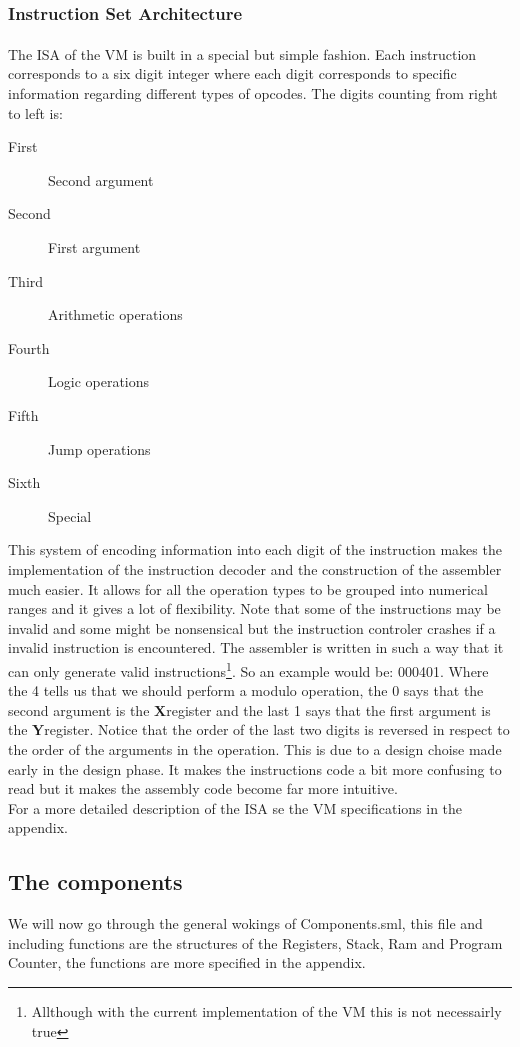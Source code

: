 \documentclass{article}
\newcommand{\x}{$\textbf{X}$}
\newcommand{\y}{$\textbf{Y}$}
\begin{document}
\subsubsection{Instruction Set Architecture}
The ISA\textsuperscript{\cite{ISA}} of the VM is built in a special but simple
fashion. Each instruction corresponds to a six digit integer
where each digit corresponds to specific information regarding different types
of opcodes. The digits counting from right to left is:

\begin{description}
  \item[First] Second argument
  \item[Second] First argument
  \item[Third] Arithmetic operations
  \item[Fourth] Logic operations
  \item[Fifth] Jump operations
  \item[Sixth] Special
\end{description}
This system of encoding information into each digit of the instruction makes the
implementation of the instruction decoder and the construction of the assembler
much easier.
It allows for all the operation types to be grouped into numerical ranges and it
gives  a lot of flexibility. Note that some of the instructions may be invalid
and some might be nonsensical but the instruction controler crashes if a invalid
instruction is encountered. The assembler is written in such a way that it can
only generate valid instructions\footnote{Allthough with the current
implementation of  the VM this is not necessairly true}.
So an example would be:
000401.
Where the 4 tells us that we should perform a modulo operation,
the 0 says that the second argument is the \x register and the last 1 says
that the first argument is the \y register. Notice that the order of
the last two digits is reversed in respect to the order of the arguments in
the operation.
This is due to a design choise made early in the design phase. It makes the
instructions code a bit more confusing to read but it makes the assembly code
become far more intuitive.\\
For a more detailed description of the ISA se the VM specifications in the
appendix.

\subsection{The components}
We will now go through the general wokings of Components.sml, this file and
including functions are the structures of the Registers, Stack, Ram and Program
Counter, the functions are more specified in the appendix.
\end{document}
